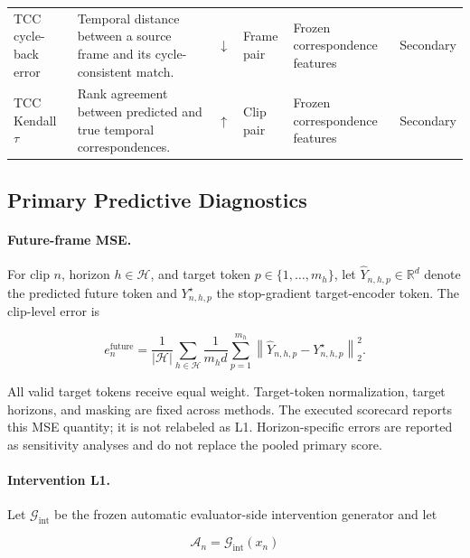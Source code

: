 \begin{table}[t]
\begin{tabularx}{\textwidth}{
    p{}
    p{}
    p{}
    p{}
    p{}
    X
}
TCC cycle-back error
&
Temporal distance between a source frame and its cycle-consistent
match.
&
\(\downarrow\)
&
Frame pair
&
Frozen correspondence features
&
Secondary
\\

TCC Kendall \(\tau\)
&
Rank agreement between predicted and true temporal correspondences.
&
\(\uparrow\)
&
Clip pair
&
Frozen correspondence features
&
Secondary
\\

\bottomrule
\end{tabularx}
\end{table}


\subsection{Primary Predictive Diagnostics}
\label{app:primary_metric_definitions}

\paragraph{Future-frame MSE.}
For clip \(n\), horizon \(h\in\mathcal H\), and target token
\(p\in\{1,\ldots,m_h\}\), let
\(\widehat Y_{n,h,p}\in\mathbb R^d\) denote the predicted future token
and \(Y^\star_{n,h,p}\) the stop-gradient target-encoder token. The
clip-level error is

\begin{equation*}
e_n^{\mathrm{future}}
=
\frac{1}{|\mathcal H|}
\sum_{h\in\mathcal H}
\frac{1}{m_h d}
\sum_{p=1}^{m_h}
\left\|
\widehat Y_{n,h,p}
-
Y^\star_{n,h,p}
\right\|_2^2 .
\end{equation*}

All valid target tokens receive equal weight. Target-token
normalization, target horizons, and masking are fixed across methods.
The executed scorecard reports this MSE quantity; it is not relabeled
as L1. Horizon-specific errors are reported as sensitivity analyses and
do not replace the pooled primary score.

\paragraph{Intervention L1.}
Let \(\mathcal G_{\mathrm{int}}\) be the frozen automatic
evaluator-side intervention generator and let

\begin{equation*}
\mathcal A_n
=
\mathcal G_{\mathrm{int}}(x_n)
\end{equation*}

